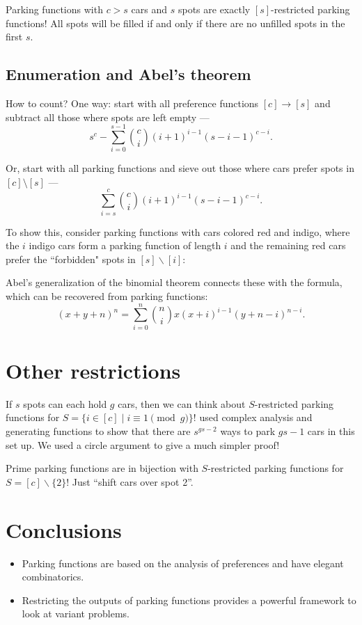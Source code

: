 \documentclass[thesis]{hmcposter}
\begin{document}
\begin{poster}
Parking functions with $c > s$ cars and $s$ spots are exactly $[s]$-restricted parking functions! All spots will be filled if and only if there are no unfilled spots in the first $s$.

\subsection{Enumeration and Abel's theorem}

How to count? One way: start with all preference functions $[c] \to [s]$ and subtract all those where spots are left empty ---
\[
	s^{c} - \sum_{i = 0}^{s - 1} \binom{c}{i} (i + 1)^{i - 1} (s - i - 1)^{c - i}.
\]

Or, start with all parking functions and sieve out those where cars prefer spots in $[c] \setminus [s]$ ---
\[
	\sum_{i = s}^{c} \binom{c}{i} (i + 1)^{i - 1} (s - i - 1)^{c - i}.
\]

To show this, consider parking functions with cars colored red and indigo, where the $i$ indigo cars form a parking function of length $i$ and the remaining red cars prefer the ``forbidden" spots in $[s]\backslash [i]$:



Abel's generalization of the binomial theorem connects these with the formula, which can be recovered from parking functions:
\[
	(x + y + n)^{n} = \sum_{i = 0}^{n} \binom{n}{i} x (x + i)^{i - 1} (y + n - i)^{n - i}.
\]

\newcolumn 
\section{Other restrictions}

If $s$ spots can each hold $g$ cars, then we can think about $S$-restricted parking functions for $S = \{ i \in [c] \mid i \equiv 1 \pmod g \}$! \cite{blake-konheim-1977} used complex analysis and generating functions to show that there are $s^{gs - 2}$ ways to park $gs - 1$ cars in this set up. We used a circle argument to give a much simpler proof!

Prime parking functions are in bijection with $S$-restricted parking functions for $S = [c]\backslash\{2\}$! Just ``shift cars over spot 2''.

\section{Conclusions}

\begin{itemize}
    \item Parking functions are based on the analysis of preferences and have elegant combinatorics.
    \item Restricting the outputs of parking functions provides a powerful framework to look at variant problems.
\end{itemize}


\end{poster}
\end{document}
